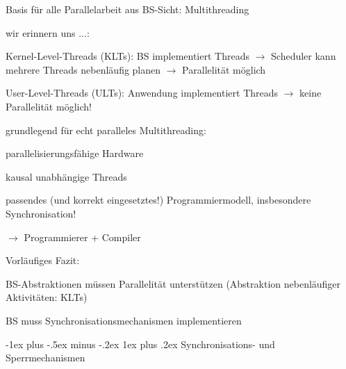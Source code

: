 \documentclass[a4paper]{article}
\makeatletter
\renewcommand{\subsubsection}{\@startsection{subsubsection}{3}{0mm}%
 {-1ex plus -.5ex minus -.2ex}%
 {1ex plus .2ex}%
 {\normalfont\small\bfseries}}
\makeatother
\begin{document}
\begin{multicols}{3}
    \begin{itemize*}
        \item Basis für alle Parallelarbeit aus BS-Sicht: Multithreading
        \item wir erinnern uns ...:
        \begin{itemize*}
            \item Kernel-Level-Threads (KLTs): BS implementiert Threads $\rightarrow$ Scheduler kann mehrere Threads nebenläufig planen $\rightarrow$ Parallelität möglich
            \item User-Level-Threads (ULTs): Anwendung implementiert Threads $\rightarrow$ keine Parallelität möglich!
        \end{itemize*}
        \item grundlegend für echt paralleles Multithreading:
        \begin{itemize*}
            \item parallelisierungsfähige Hardware
            \item kausal unabhängige Threads
            \item passendes (und korrekt eingesetztes!) Programmiermodell, insbesondere Synchronisation!
            \item[$\rightarrow$] Programmierer + Compiler
        \end{itemize*}
    \end{itemize*}

    Vorläufiges Fazit:

    \begin{itemize*}
        \item BS-Abstraktionen müssen Parallelität unterstützen (Abstraktion
        nebenläufiger Aktivitäten: KLTs)
        \item BS muss Synchronisationsmechanismen implementieren
    \end{itemize*}


    \subsubsection{Synchronisations- und
        Sperrmechanismen}


\end{multicols}
\end{document}
